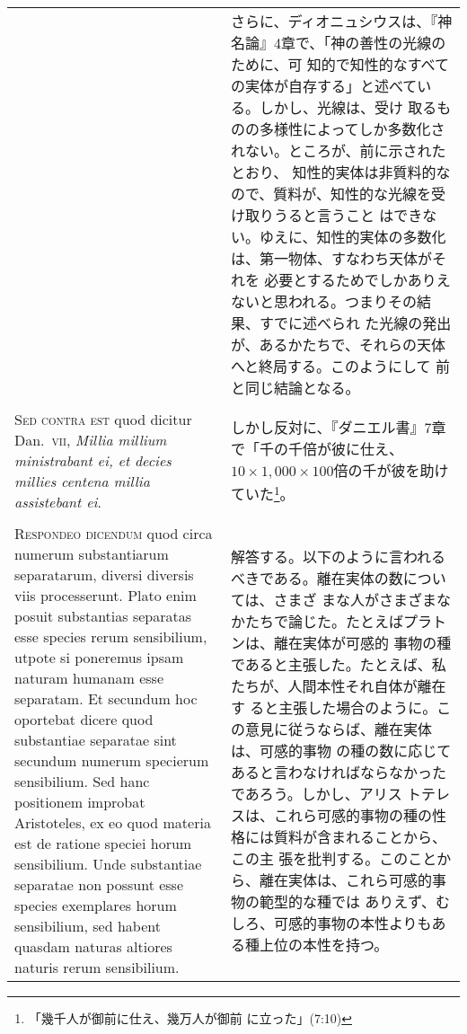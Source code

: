 \documentclass[10pt]{jsarticle} %
\begin{document}
\begin{longtable}{p{21em}p{21em}}
&

さらに、ディオニュシウスは、『神名論』4章で、「神の善性の光線のために、可
 知的で知性的なすべての実体が自存する」と述べている。しかし、光線は、受け
 取るものの多様性によってしか多数化されない。ところが、前に示されたとおり、
 知性的実体は非質料的なので、質料が、知性的な光線を受け取りうると言うこと
 はできない。ゆえに、知性的実体の多数化は、第一物体、すなわち天体がそれを
 必要とするためでしかありえないと思われる。つまりその結果、すでに述べられ
 た光線の発出が、あるかたちで、それらの天体へと終局する。このようにして
 前と同じ結論となる。


\\\\


{\scshape Sed contra est} quod dicitur Dan.~{\scshape vii}, {\itshape Millia
millium ministrabant ei, et decies millies centena millia assistebant
ei}.

&
しかし反対に、『ダニエル書』7章で「千の千倍が彼に仕え、$10 \times 1,000 \times
 100$倍の千が彼を助けていた\footnote{「幾千人が御前に仕え、幾万人が御前
 に立った」(7:10)}。

\\\\


{\scshape Respondeo dicendum} quod circa numerum
substantiarum separatarum, diversi diversis viis processerunt. Plato
enim posuit substantias separatas esse species rerum sensibilium, utpote
si poneremus ipsam naturam humanam esse separatam. Et secundum hoc
oportebat dicere quod substantiae separatae sint secundum numerum
specierum sensibilium. Sed hanc positionem improbat Aristoteles, ex eo
quod materia est de ratione speciei horum sensibilium. Unde substantiae
separatae non possunt esse species exemplares horum sensibilium, sed
habent quasdam naturas altiores naturis rerum sensibilium. 



&

解答する。以下のように言われるべきである。離在実体の数については、さまざ
 まな人がさまざまなかたちで論じた。たとえばプラトンは、離在実体が可感的
 事物の種であると主張した。たとえば、私たちが、人間本性それ自体が離在す
 ると主張した場合のように。この意見に従うならば、離在実体は、可感的事物
 の種の数に応じてあると言わなければならなかったであろう。しかし、アリス
 トテレスは、これら可感的事物の種の性格には質料が含まれることから、この主
 張を批判する。このことから、離在実体は、これら可感的事物の範型的な種では
 ありえず、むしろ、可感的事物の本性よりもある種上位の本性を持つ。



\end{longtable}
\end{document}
